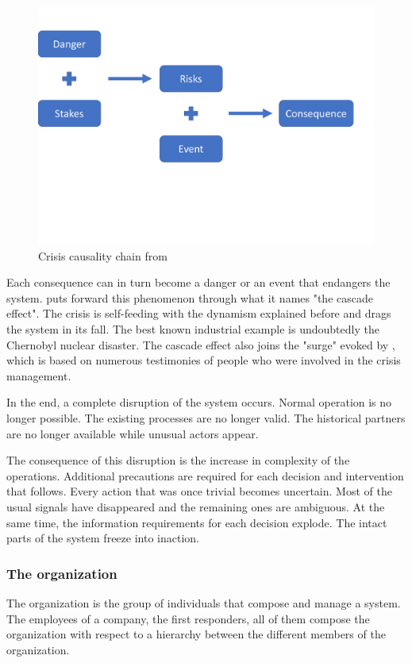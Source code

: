 \begin{figure}
    \centering
    \includegraphics[width=\textwidth]{figures/fred-consequences-framework.pdf}
    \caption{Crisis causality chain from \cite{benabenCollaborativeSystemsCrisis2014}}
    \label{context:fred-framework}
\end{figure}

Each consequence can in turn become a danger or an event that endangers the system.
\cite{fertierInterpretationAutomatiqueDonnees2018a} puts forward this phenomenon through what it names "the cascade effect".
The crisis is self-feeding with the dynamism explained before and drags the system in its fall.
The best known industrial example is undoubtedly the Chernobyl nuclear disaster.
The cascade effect also joins the "surge" evoked by \cite{lagadecGESTIONCRISES1994}, which is based on numerous testimonies of people who were involved in the crisis management.

In the end, a complete disruption of the system occurs.
Normal operation is no longer possible. The existing processes are no longer valid.
The historical partners are no longer available while unusual actors appear.

The consequence of this disruption is the increase in complexity of the operations.
Additional precautions are required for each decision and intervention that follows.
Every action that was once trivial becomes uncertain.
Most of the usual signals have disappeared and the remaining ones are ambiguous.
At the same time, the information requirements for each decision explode.
The intact parts of the system freeze into inaction.

\subsubsection{The organization}
The organization is the group of individuals that compose and manage a system.
The employees of a company, the first responders, all of them compose the organization with respect to a hierarchy between the different members of the organization.

